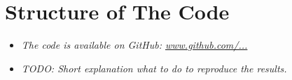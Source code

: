 \section{Structure of The Code}

\begin{itemize}
    \item \textit{The code is available on GitHub: \url{www.github.com/...}}
    \item \textit{TODO: Short explanation what to do to reproduce the results.}
\end{itemize}






